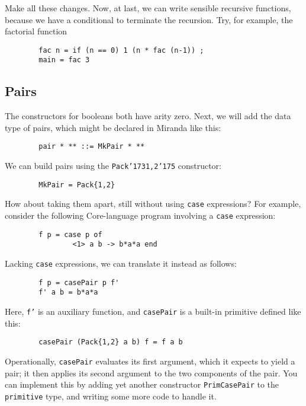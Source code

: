 \begin{exercise}
Make all these changes.
Now, at last, we can write sensible recursive functions, because we
have a conditional to terminate the recursion.
Try, for example, the factorial function
\begin{verbatim}
        fac n = if (n == 0) 1 (n * fac (n-1)) ;
        main = fac 3
\end{verbatim}
\end{exercise}

\subsection{Pairs}

The constructors for booleans both have arity zero.  Next, we will
add the data type of pairs, which might be declared in Miranda like this:
\begin{verbatim}
        pair * ** ::= MkPair * **
\end{verbatim}

We can build pairs using the \mbox{\tt Pack{\char'173}1,2{\char'175}} constructor:
\begin{verbatim}
        MkPair = Pack{1,2}
\end{verbatim}
How about taking them apart, still without using \mbox{\tt case} expressions?
For example, consider the following Core-language program involving
a \mbox{\tt case} expression:
\begin{verbatim}
        f p = case p of
                <1> a b -> b*a*a end
\end{verbatim}
Lacking \mbox{\tt case} expressions, we can translate it instead as follows:
\begin{verbatim}
        f p = casePair p f'
        f' a b = b*a*a
\end{verbatim}
Here, \mbox{\tt f'} is an auxiliary function, and \mbox{\tt casePair} is a built-in primitive
defined like this:
\begin{verbatim}
        casePair (Pack{1,2} a b) f = f a b
\end{verbatim}

Operationally, \mbox{\tt casePair} evaluates its first argument, which it expects to
yield a pair; it then applies its second argument to the two components of
the pair.
You can implement this by adding yet another constructor \mbox{\tt PrimCasePair} to
the \mbox{\tt primitive} type, and writing some more code to handle it.

